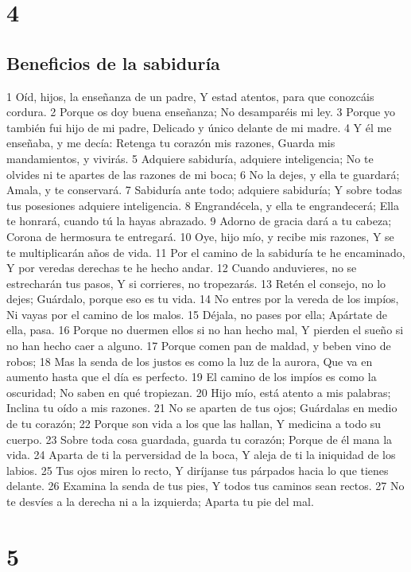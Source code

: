 \chapter{4}

\section*{Beneficios de la sabiduría}

1 Oíd, hijos, la enseñanza de un padre,
Y estad atentos, para que conozcáis cordura.
2 Porque os doy buena enseñanza;
No desamparéis mi ley.
3 Porque yo también fui hijo de mi padre,
Delicado y único delante de mi madre.
4 Y él me enseñaba, y me decía:
Retenga tu corazón mis razones,
Guarda mis mandamientos, y vivirás.
5 Adquiere sabiduría, adquiere inteligencia;
No te olvides ni te apartes de las razones de mi boca;
6 No la dejes, y ella te guardará;
Amala, y te conservará.
7 Sabiduría ante todo; adquiere sabiduría;
Y sobre todas tus posesiones adquiere inteligencia.
8 Engrandécela, y ella te engrandecerá;
Ella te honrará, cuando tú la hayas abrazado.
9 Adorno de gracia dará a tu cabeza;
Corona de hermosura te entregará.
10 Oye, hijo mío, y recibe mis razones,
Y se te multiplicarán años de vida.
11 Por el camino de la sabiduría te he encaminado,
Y por veredas derechas te he hecho andar.
12 Cuando anduvieres, no se estrecharán tus pasos,
Y si corrieres, no tropezarás.
13 Retén el consejo, no lo dejes;
Guárdalo, porque eso es tu vida.
14 No entres por la vereda de los impíos,
Ni vayas por el camino de los malos.
15 Déjala, no pases por ella;
Apártate de ella, pasa.
16 Porque no duermen ellos si no han hecho mal,
Y pierden el sueño si no han hecho caer a alguno.
17 Porque comen pan de maldad, y beben vino de robos;
18 Mas la senda de los justos es como la luz de la aurora,
Que va en aumento hasta que el día es perfecto.
19 El camino de los impíos es como la oscuridad;
No saben en qué tropiezan.
20 Hijo mío, está atento a mis palabras;
Inclina tu oído a mis razones.
21 No se aparten de tus ojos;
Guárdalas en medio de tu corazón;
22 Porque son vida a los que las hallan,
Y medicina a todo su cuerpo.
23 Sobre toda cosa guardada, guarda tu corazón;
Porque de él mana la vida.
24 Aparta de ti la perversidad de la boca,
Y aleja de ti la iniquidad de los labios.
25 Tus ojos miren lo recto,
Y diríjanse tus párpados hacia lo que tienes delante.
26 Examina la senda de tus pies, 
Y todos tus caminos sean rectos.
27 No te desvíes a la derecha ni a la izquierda;
Aparta tu pie del mal.

\chapter{5}

